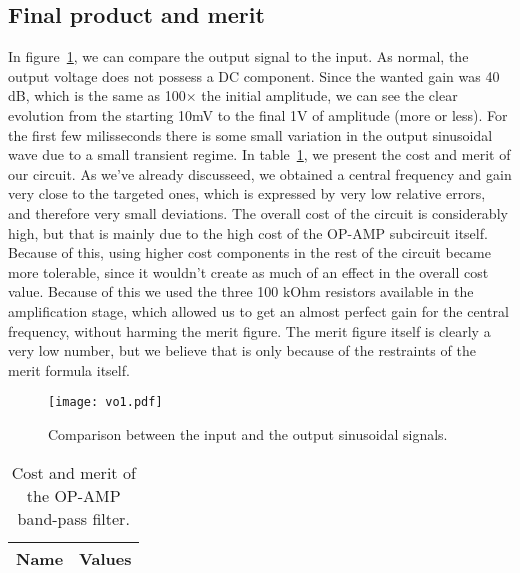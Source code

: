 \subsection{Final product and merit}
In figure~\ref{fig:comp}, we can compare the output signal to the input. As normal, the output voltage does not possess a DC component. Since the wanted gain was 40 dB, which is the same as 100$\times$ the initial amplitude, we can see the clear evolution from the starting 10mV to the final 1V of amplitude (more or less). For the first few milisseconds there is some small variation in the output sinusoidal wave due to a small transient regime.
In table~\ref{tab:merit}, we present the cost and merit of our circuit. As we've already discusseed, we obtained a central frequency and gain very close to the targeted ones, which is expressed by very low relative errors, and therefore very small deviations. The overall cost of the circuit is considerably high, but that is mainly due to the high cost of the OP-AMP subcircuit itself. Because of this, using higher cost components in the rest of the circuit became more tolerable, since it wouldn't create as much of an effect in the overall cost value. Because of this we used the three 100 kOhm resistors available in the amplification stage, which allowed us to get an almost perfect gain for the central frequency, without harming the merit figure. The merit figure itself is clearly a very low number, but we believe that is only because of the restraints of the merit formula itself.
\pagebreak
\begin{figure}[h!] \centering
\texttt{[image: vo1.pdf]}
\caption{Comparison between the input and the output sinusoidal signals.}
\label{fig:comp}
\end{figure}
\par
\begin{table}[h!]
  \centering
  \begin{tabular}{|l|r|}
    \hline    
    {\bf Name} & {\bf Values} \\ \hline
     
  \end{tabular}
  \caption{Cost and merit of the OP-AMP band-pass filter.}
  \label{tab:merit}
\end{table}

\pagebreak